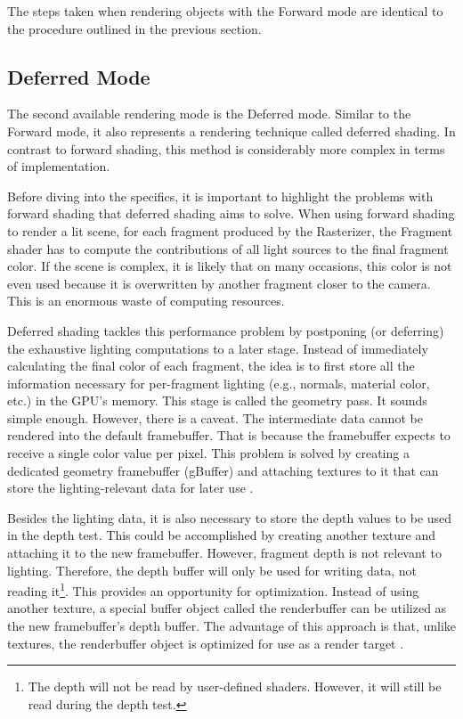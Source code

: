 \documentclass[
  digital,     %
  oneside,     %
  nosansbold,  %
  nocolorbold, %
  lof,         %
  lot,         %
]{fithesis4}
\begin{document}
The steps taken when rendering objects with the Forward mode are identical to the procedure outlined
in the previous section.

\subsection{Deferred Mode}
The second available rendering mode is the Deferred mode. Similar to the Forward mode, it also represents
a rendering technique called deferred shading. In contrast to forward shading, this method is considerably
more complex in terms of implementation.

Before diving into the specifics, it is important to highlight the problems with forward shading
that deferred shading aims to solve. When using forward shading to render a lit scene,
for each fragment produced by the Rasterizer, the Fragment shader has to compute the contributions
of all light sources to the final fragment color. If the scene is complex, it is likely that on many occasions,
this color is not even used because it is overwritten by another fragment closer to the camera.
This is an enormous waste of computing resources.

Deferred shading tackles this performance problem by postponing (or deferring) the exhaustive lighting computations to a later stage.
Instead of immediately calculating the final color of each fragment,
the idea is to first store all the information necessary for per-fragment lighting
(e.g., normals, material color, etc.) in the GPU's memory. This stage is called the geometry pass. It sounds
simple enough. However, there is a caveat. The intermediate data cannot be rendered into the default framebuffer.
That is because the framebuffer expects to receive a single color value per pixel.
This problem is solved by creating a dedicated geometry framebuffer (gBuffer) and attaching textures to it
that can store the lighting-relevant data for later use \cite{learnopengl-deferred}.

Besides the lighting data, it is also necessary
to store the depth values to be used in the depth test. This could be accomplished by creating another texture
and attaching it to the new framebuffer. However, fragment depth is not relevant to lighting.
Therefore, the depth buffer will only be used for writing data, not reading it\footnote{The depth will not be read by user-defined shaders.
However, it will still be read during the depth test.}. This provides an opportunity for optimization.
Instead of using another texture, a special buffer object called the renderbuffer can be utilized as the new
framebuffer's depth buffer. The advantage of this approach is that, unlike textures, the renderbuffer object is optimized for
use as a render target \cite[p.526-540]{opengl-book} \cite{openglwiki-rbo}.
\end{document}
